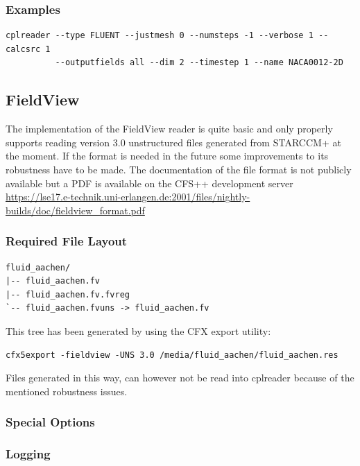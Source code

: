 \documentclass[a4paper,10pt]{article}
\begin{document}
\subsubsection{Examples}

\begin{verbatim}
cplreader --type FLUENT --justmesh 0 --numsteps -1 --verbose 1 --calcsrc 1 
          --outputfields all --dim 2 --timestep 1 --name NACA0012-2D
\end{verbatim}

\newpage
\subsection{FieldView}
\label{sec:fieldview}

The implementation  of the FieldView reader  is quite basic  and only properly
supports reading version 3.0 unstructured files generated from STARCCM+ at the
moment.   If the  format is  needed  in the  future some  improvements to  its
robustness  have to  be made.  The  documentation of  the file  format is  not
publicly  available but a  PDF is  available on  the CFS++  development server
\url{https://lse17.e-technik.uni-erlangen.de:2001/files/nightly-builds/doc/fieldview_format.pdf}

\subsubsection{Required File Layout}
\begin{verbatim}
fluid_aachen/
|-- fluid_aachen.fv
|-- fluid_aachen.fv.fvreg
`-- fluid_aachen.fvuns -> fluid_aachen.fv
\end{verbatim}

This tree has been generated by using the CFX export utility:
\begin{verbatim}
cfx5export -fieldview -UNS 3.0 /media/fluid_aachen/fluid_aachen.res
\end{verbatim}

Files generated in this way, can however not be read into cplreader because of
the mentioned robustness issues.

\subsubsection{Special Options}

\subsubsection{Logging} 
\end{document}
